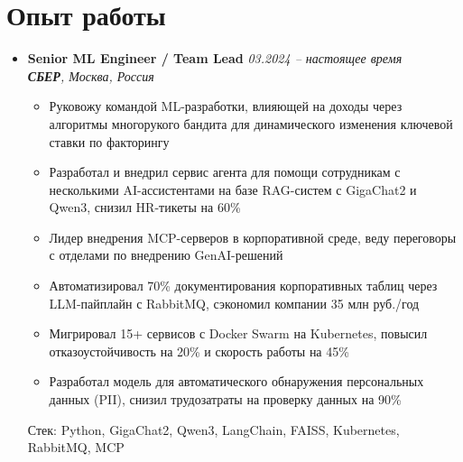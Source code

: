 \documentclass[letterpaper,11pt]{article}
\begin{document}
\section{Опыт работы}

\begin{itemize}[leftmargin=0.15in, label={}]
    \item \textbf{Senior ML Engineer / Team Lead} \hfill \textit{03.2024 -- настоящее время} \\
    \textit{\textbf{СБЕР}, Москва, Россия} \\
    \vspace{-10pt}
    \begin{itemize}
        \item Руковожу командой ML-разработки, влияющей на доходы через алгоритмы многорукого бандита для динамического изменения ключевой ставки по факторингу
        \item Разработал и внедрил сервис агента для помощи сотрудникам с несколькими AI-ассистентами на базе RAG-систем с GigaChat2 и Qwen3, снизил HR-тикеты на 60\%
        \item Лидер внедрения MCP-серверов в корпоративной среде, веду переговоры с отделами по внедрению GenAI-решений
        \item Автоматизировал 70\% документирования корпоративных таблиц через LLM-пайплайн с RabbitMQ, сэкономил компании 35 млн руб./год
        \item Мигрировал 15+ сервисов с Docker Swarm на Kubernetes, повысил отказоустойчивость на 20\% и скорость работы на 45\%
        \item Разработал модель для автоматического обнаружения персональных данных (PII), снизил трудозатраты на проверку данных на 90\%
    \end{itemize}
    \vspace{-10pt}
    Стек: Python, GigaChat2, Qwen3, LangChain, FAISS, Kubernetes, RabbitMQ, MCP
    \vspace{-5pt}


\end{itemize}
\end{document}
